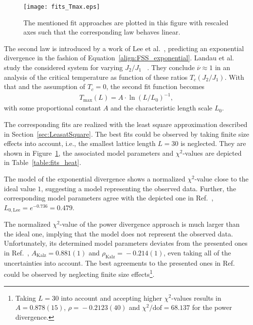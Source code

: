 \begin{figure}[!h]
  \texttt{[image: fits\_Tmax.eps]}
  \caption{The mentioned fit approaches are plotted in this figure with rescaled axes such that the corresponding law behaves linear.}
  \label{fig:fits_heat}
\end{figure}

The second law is introduced by a work of Lee et al.~\cite{Lee2024}, predicting
an exponential divergence in the fashion of Equation~\eqref{align:FSS_exponential}. Landau et al. study the considered system for 
varying $J_2/J_1$ ~\cite{Landau1980}. They conclude $\overline{\nu}\!\approx\!1$ in an analysis of the critical temperature as function of these ratios 
$T_c(J_2/J_1)$. With that and the assumption of $T_c\!=\!0$, the second fit function becomes 
\begin{align*}
  T_\mathrm{max}(L)=A\cdot\ln(L/L_0)^{-1},
\end{align*}
with some proportional constant $A$ and the characteristic length scale $L_0$. 

The corresponding fits are realized with the least square approximation described in Section~\ref{sec:LeasatSquare}. 
The best fits could be observed by taking finite size effects into account, i.e., the smallest lattice length $L\!=\!30$ is neglected. They are 
shown in Figure~\ref{fig:fits_heat}, the associated model parameters and $\chi^2$-values are depicted in Table~\ref{table:fits_heat}.


The model of the exponential divergence shows a normalized $\chi^2$-value close to the ideal value $1$, suggesting a model 
representing the observed data. Further, the corresponding model parameters agree with the depicted one in Ref.~\cite{Lee2024}, 
$L_{0,\mathrm{Lee}}\!=\!e^{-0.736}\!=\!0.479$. 


The normalized $\chi^2$-value of the power divergence approach is much larger than the ideal one, implying 
that the model does not represent the observed data. Unfortunately, its determined model parameters deviates from the presented ones in Ref.~\cite{Kalz2008}, 
$A_\mathrm{Kalz}\!=\!0.881(1)$ and $\rho_\mathrm{Kalz}\!=\!-\!0.214(1)$, even taking all of the uncertainties into account. The best agreements to the 
presented ones in Ref.~\cite{Kalz2008} could be observed by neglecting finite size effects\footnote{Taking $L\!=\!30$ into account and accepting higher $\chi^2$-values 
results in $A\!=\!0.878(15)$, $\rho\!=\!-0.2123(40)$ and $\chi^2/\mathrm{dof}\!=\!68.137$ for the power divergence.}.
\\

